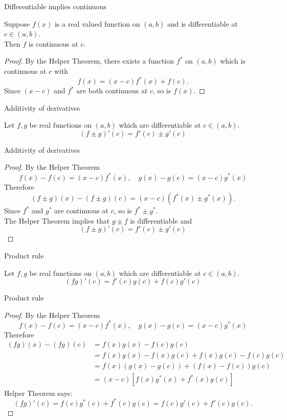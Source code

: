 \documentclass{beamer}
\begin{document}
\begin{frame}{Differentiable implies continuous}
\begin{thm}
Suppose $f(x)$ is a real valued function on $(a,b)$ and is differentiable at $c\in (a,b)$.\\
Then $f$ is continuous at $c$.
\end{thm}
\pause
\begin{proof}
\pause
By the Helper Theorem, there exists a function $f^*$ on $(a,b)$ which is continuous at $c$ with
$$f(x) = (x-c)f^*(x) + f(c).$$
\pause
Since $(x-c)$ and $f^*$ are both continuous at $c$, so is $f(x)$.
\end{proof}
\end{frame}

\begin{frame}{Additivity of derivatives}
\begin{thm}
Let $f,g$ be real functions on $(a,b)$ which are differentiable at $c\in (a,b)$.\\
$$(f\pm g)'(c) = f'(c) \pm g'(c)$$
\end{thm}
\end{frame}

\begin{frame}{Additivity of derivatives}
\begin{proof}
\pause
By the Helper Theorem
$$f(x)-f(c) = (x-c)f^*(x),\quad g(x)-g(c) = (x-c)g^*(x)$$
\pause
Therefore
$$(f\pm g)(x) - (f\pm g)(c) = (x-c)(f^*(x) \pm g^*(x)).$$
\pause
Since $f^*$ and $g^*$ are continuous at $c$, so is $f^*\pm g^*$.\\
\pause
The Helper Theorem implies that $g\pm f$ is differentiable and
$$(f\pm g)'(c) = f'(c) \pm g'(c)$$
\end{proof}
\end{frame}

\begin{frame}{Product rule}
\begin{thm}
Let $f,g$ be real functions on $(a,b)$ which are differentiable at $c\in (a,b)$.\\
$$(fg)'(c) = f'(c)g(c) + f(c)g'(c)$$
\end{thm}
\end{frame}
\begin{frame}{Product rule}
\begin{proof}
\pause
By the Helper Theorem
$$f(x)-f(c) = (x-c)f^*(x),\quad g(x)-g(c) = (x-c)g^*(x)$$
\pause
Therefore
\begin{align*}
(fg)(x)-(fg)(c)
  & = f(x)g(x) - f(c)g(c)\\
  & = f(x)g(x) - f(x)g(c) + f(x)g(c)-f(c)g(c)\\
  & = f(x)(g(x) - g(c)) + (f(x)-f(c))g(c)\\
  & = (x-c)[f(x)g^*(x) + f^*(x)g(c)]
\end{align*}
\pause
Helper Theorem says:
$$(fg)'(c) = f(c)g^*(c) + f^*(c)g(c) = f(c)g'(c) + f'(c)g(c).$$
\end{proof}
\end{frame}
\end{document}
